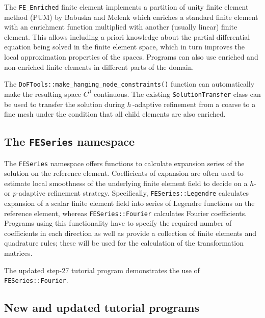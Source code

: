 \documentclass{ansarticle-preprint}
\begin{document}
The \verb!FE_Enriched! finite element implements a partition of unity
finite element method (PUM) by Babuska and Melenk which enriches a standard
finite element with an enrichment function multiplied with another (usually
linear) finite element. This allows including
a priori knowledge about the partial differential equation being solved
in the finite element space,
which in turn improves the local approximation properties of the spaces.
Programs can also use enriched and non-enriched finite elements in
different parts of the domain.

The
\verb|DoFTools::make_hanging_node_constraints()| function can automatically
make the resulting space $C^0$ continuous. The existing \verb|SolutionTransfer|
class can be used to transfer the solution during $h$\,-adaptive refinement
from a coarse to a fine mesh under the condition that all child elements
are also enriched.

\subsection{The \texttt{FESeries} namespace}

The \verb|FESeries| namespace offers functions to calculate expansion
series of the solution on the reference element. Coefficients of expansion
are often used to estimate local smoothness of the underlying finite
element field to decide on a $h$- or $p$-adaptive refinement strategy.
Specifically, \verb|FESeries::Legendre| calculates expansion of a
scalar finite element
field into series of Legendre functions on the reference element, whereas
\verb|FESeries::Fourier| calculates Fourier coefficients. Programs
using this functionality have to
specify the required number of coefficients in each direction as well as
provide a collection of finite elements and quadrature rules; these will be
used for the calculation of the transformation matrices.

The updated step-27 tutorial program demonstrates the
use of \verb|FESeries::Fourier|.

\subsection{New and updated tutorial programs}
\end{document}
